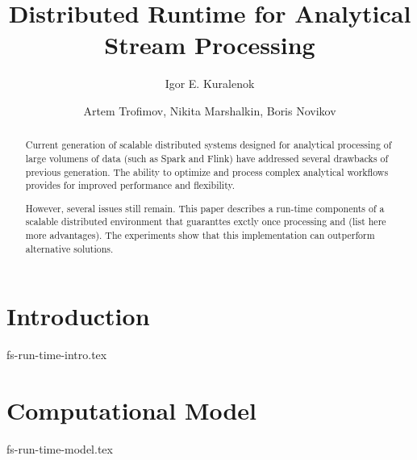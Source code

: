 \documentclass[sigconf]{acmart-edbt2018}
\begin{document}
\title {Distributed Runtime for Analytical Stream Processing}


\author{Igor E. Kuralenok}

\author{Artem Trofimov, Nikita Marshalkin, Boris Novikov}


\begin{abstract}
Current generation of scalable distributed systems designed for analytical processing of large volumens of data (such as  Spark and Flink) have addressed several drawbacks of previous generation. The ability to optimize and process complex analytical workflows  provides for improved performance and flexibility.

However, several issues still remain. This paper describes a run-time components of a scalable distributed environment that guaranttes exctly once  processing and (list here more advantages). The experiments show that this implementation can outperform alternative solutions.
\end {abstract}

\maketitle


\section {Introduction}
 {fs-run-time-intro.tex}

\section {Computational Model}
 {fs-run-time-model.tex}
\end{document}
